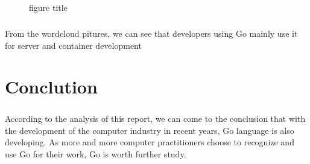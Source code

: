\documentclass[11pt,onside,a4paper,fleqn]{report}
\begin{document}
\begin{figure}[]
{\begin{minipage}[]{.4\linewidth}
    \end{minipage}
}
\caption{figure title}
\end{figure}

\paragraph{} From the wordcloud pitures, we can see that developers using Go mainly use it for server and container development

 
\chapter{Conclution}
\paragraph{} According to the analysis of this report, we can come to the conclusion that with the development of the computer industry in recent years, Go language is also developing.
As more and more computer practitioners choose to recognize and use Go for their work, Go is worth further study.
\end{document}
